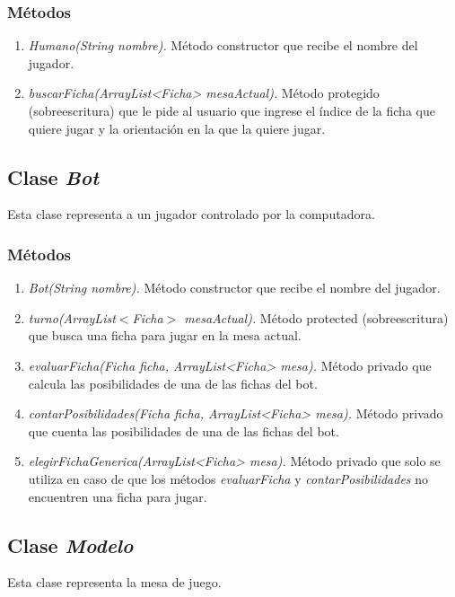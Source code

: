 \documentclass[12pt]{article}
\begin{document}
  \subsubsection{Métodos}
  \begin{enumerate}
    \item \textit{Humano(String nombre).} Método constructor que recibe el nombre del jugador.
    \item \textit{buscarFicha(ArrayList<Ficha> mesaActual).} Método protegido (sobreescritura) que le pide al usuario que ingrese el índice de la ficha que quiere jugar y la orientación en la que la quiere jugar. 
  \end{enumerate}

  \subsection{Clase \textit{Bot}}
  Esta clase representa a un jugador controlado por la computadora.

  \subsubsection{Métodos}
  \begin{enumerate}
    \item \textit{Bot(String nombre).} Método constructor que recibe el nombre del jugador.
    \item \textit{turno(ArrayList$<$Ficha$>$ mesaActual).} Método protected (sobreescritura) que busca una ficha para jugar en la mesa actual.
    \item \textit{evaluarFicha(Ficha ficha, ArrayList<Ficha> mesa).} Método privado que calcula las posibilidades de una de las fichas del bot.
    \item \textit{contarPosibilidades(Ficha ficha, ArrayList<Ficha> mesa).} Método privado que cuenta las posibilidades de una de las fichas del bot.
    \item \textit{elegirFichaGenerica(ArrayList<Ficha> mesa).} Método privado que solo se utiliza en caso de que los métodos \textit{evaluarFicha} y \textit{contarPosibilidades} no encuentren una ficha para jugar.
  \end{enumerate}

  \subsection{Clase \textit{Modelo}} 
  Esta clase representa la mesa de juego. 
\end{document}
